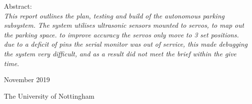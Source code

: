 \begin{titlepage}
	Abstract: \\
	\textit{
	This report outlines the plan, testing and build of the autonomous parking subsystem. The system utilises ultrasonic sensors mounted to servos, to map out the parking space. to improve accuracy the servos only move to 3 set positions. due to a deficit of pins the serial monitor was out of service, this made debugging the system very difficult, and as a result did not meet the brief within the give time.    
	}	
	
	\vfill %

	
	
	
	
	\vspace{0.3\baselineskip} %
	
	November 2019 %
	
	{\large The University of Nottingham} %

\end{titlepage}